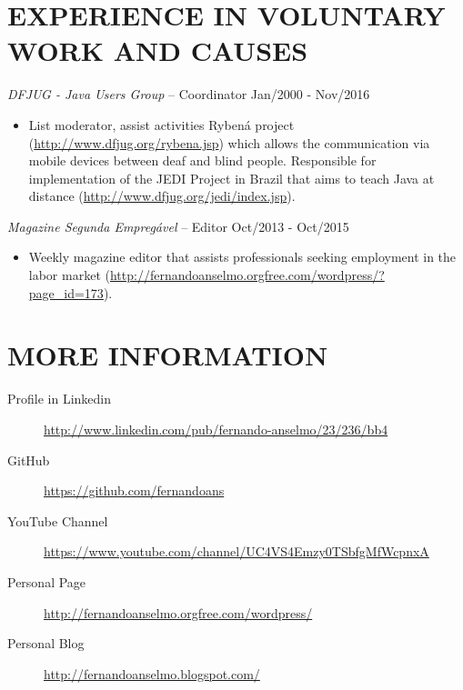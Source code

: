 \documentclass{res}
\begin{document}
\begin{resume}
		\section{EXPERIENCE IN VOLUNTARY WORK AND CAUSES}
		\vspace{8pt} 
		{\sl DFJUG - Java Users Group} -- Coordinator \hfill Jan/2000 - Nov/2016
		\begin{itemize}
			\item List moderator, assist activities Rybená project (\url{http://www.dfjug.org/rybena.jsp}) 
			which allows the communication via mobile devices between deaf and blind people. Responsible for implementation
			of the JEDI Project in Brazil that aims to teach Java at distance (\url{http://www.dfjug.org/jedi/index.jsp}).
		\end{itemize}
		
		{\sl Magazine Segunda Empregável} -- Editor \hfill Oct/2013 - Oct/2015
		\begin{itemize}
			\item Weekly magazine editor that assists professionals seeking employment in the labor 
			market (\url{http://fernandoanselmo.orgfree.com/wordpress/?page_id=173}).
		\end{itemize}
		
		\section{MORE INFORMATION}
		\vspace{18pt} 
		\begin{description}
			\item[Profile in Linkedin] \url{http://www.linkedin.com/pub/fernando-anselmo/23/236/bb4}
			\item[GitHub] \url{https://github.com/fernandoans}
			\item[YouTube Channel] \url{https://www.youtube.com/channel/UC4VS4Emzy0TSbfgMfWcpnxA}
			\item[Personal Page] \url{http://fernandoanselmo.orgfree.com/wordpress/}
			\item[Personal Blog] \url{http://fernandoanselmo.blogspot.com/}
		\end{description}
	\end{resume} 
\end{document}
